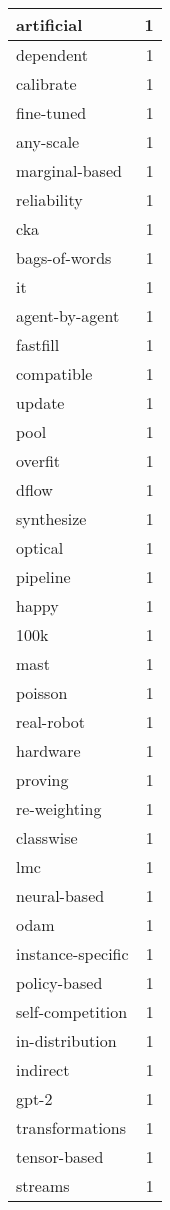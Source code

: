 \begin{table}[h]
\begin{tabular}{|l|r|}
\hline
artificial & 1 \\
\hline
dependent & 1 \\
\hline
calibrate & 1 \\
\hline
fine-tuned & 1 \\
\hline
any-scale & 1 \\
\hline
marginal-based & 1 \\
\hline
reliability & 1 \\
\hline
cka & 1 \\
\hline
bags-of-words & 1 \\
\hline
it & 1 \\
\hline
agent-by-agent & 1 \\
\hline
fastfill & 1 \\
\hline
compatible & 1 \\
\hline
update & 1 \\
\hline
pool & 1 \\
\hline
overfit & 1 \\
\hline
dflow & 1 \\
\hline
synthesize & 1 \\
\hline
optical & 1 \\
\hline
pipeline & 1 \\
\hline
happy & 1 \\
\hline
100k & 1 \\
\hline
mast & 1 \\
\hline
poisson & 1 \\
\hline
real-robot & 1 \\
\hline
hardware & 1 \\
\hline
proving & 1 \\
\hline
re-weighting & 1 \\
\hline
classwise & 1 \\
\hline
lmc & 1 \\
\hline
neural-based & 1 \\
\hline
odam & 1 \\
\hline
instance-specific & 1 \\
\hline
policy-based & 1 \\
\hline
self-competition & 1 \\
\hline
in-distribution & 1 \\
\hline
indirect & 1 \\
\hline
gpt-2 & 1 \\
\hline
transformations & 1 \\
\hline
tensor-based & 1 \\
\hline
streams & 1 \\

\end{tabular}
\end{table}
